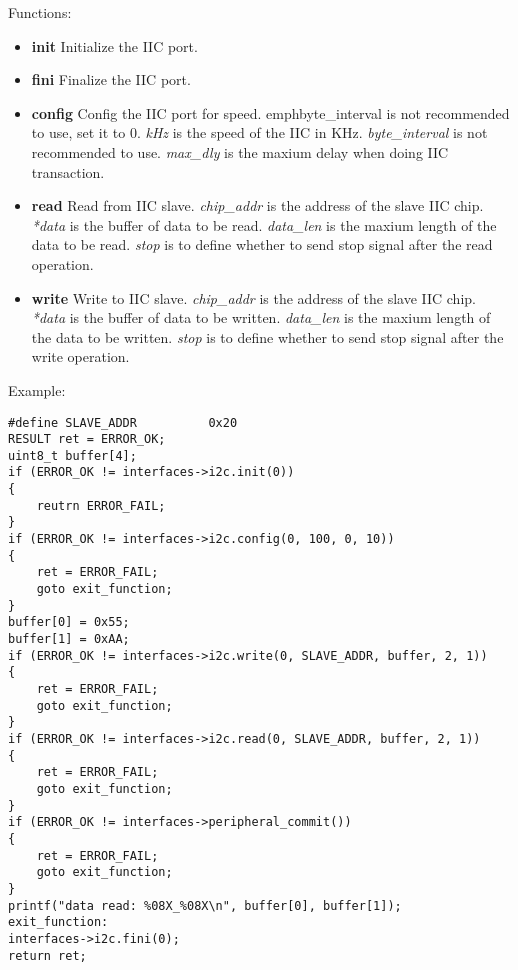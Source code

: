 \documentclass[a4paper,12pt]{book}
\begin{document}
\vspace{6pt}
Functions:
\begin{itemize}
\item \textbf{init}
Initialize the IIC port.
\item \textbf{fini}
Finalize the IIC port.
\item \textbf{config}
Config the IIC port for speed. emph{byte\_interval} is not recommended to use, set it to 0.
\newline\emph{kHz} is the speed of the IIC in KHz.
\newline\emph{byte\_interval} is not recommended to use.
\newline\emph{max\_dly} is the maxium delay when doing IIC transaction.
\item \textbf{read}
Read from IIC slave.
\newline\emph{chip\_addr} is the address of the slave IIC chip.
\newline\emph{*data} is the buffer of data to be read.
\newline\emph{data\_len} is the maxium length of the data to be read.
\newline\emph{stop} is to define whether to send stop signal after the read operation.
\item \textbf{write}
Write to IIC slave.
\newline\emph{chip\_addr} is the address of the slave IIC chip.
\newline\emph{*data} is the buffer of data to be written.
\newline\emph{data\_len} is the maxium length of the data to be written.
\newline\emph{stop} is to define whether to send stop signal after the write operation.
\end{itemize}

\vspace{6pt}
Example:
\begin{lstlisting}
#define SLAVE_ADDR			0x20
RESULT ret = ERROR_OK;
uint8_t buffer[4];
if (ERROR_OK != interfaces->i2c.init(0))
{
	reutrn ERROR_FAIL;
}
if (ERROR_OK != interfaces->i2c.config(0, 100, 0, 10))
{
	ret = ERROR_FAIL;
	goto exit_function;
}
buffer[0] = 0x55;
buffer[1] = 0xAA;
if (ERROR_OK != interfaces->i2c.write(0, SLAVE_ADDR, buffer, 2, 1))
{
	ret = ERROR_FAIL;
	goto exit_function;
}
if (ERROR_OK != interfaces->i2c.read(0, SLAVE_ADDR, buffer, 2, 1))
{
	ret = ERROR_FAIL;
	goto exit_function;
}
if (ERROR_OK != interfaces->peripheral_commit())
{
	ret = ERROR_FAIL;
	goto exit_function;
}
printf("data read: %08X_%08X\n", buffer[0], buffer[1]);
exit_function:
interfaces->i2c.fini(0);
return ret;
\end{lstlisting}
\end{document}
